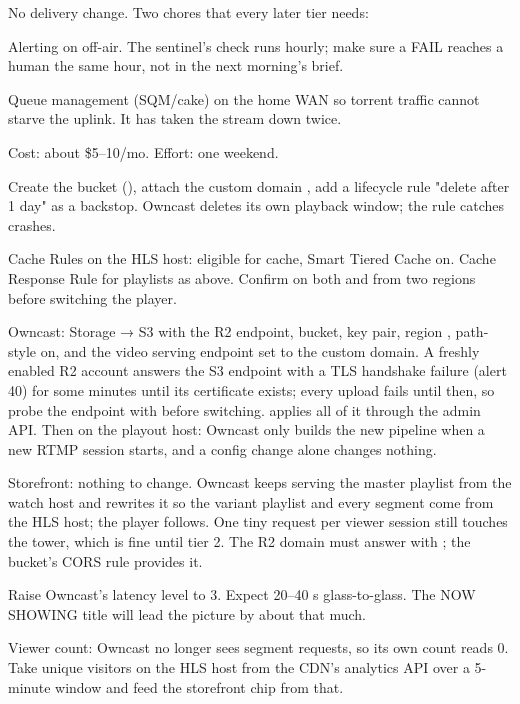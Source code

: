 \documentclass[fontpath=fonts/,logopath=logo/]{riposte-doc}
\begin{document}
No delivery change. Two chores that every later tier needs:

\begin{ripbullets}
\item Alerting on off-air. The sentinel's  check runs hourly; make sure a FAIL reaches a human the same hour, not in the next morning's brief.
\item Queue management (SQM/cake) on the home WAN so torrent traffic cannot starve the uplink. It has taken the stream down twice.
\end{ripbullets}


Cost: about \$5–10/mo. Effort: one weekend.

\begin{ripbullets}
\item Create the bucket (), attach the custom domain , add a lifecycle rule "delete after 1 day" as a backstop. Owncast deletes its own playback window; the rule catches crashes.
\item Cache Rules on the HLS host: eligible for cache, Smart Tiered Cache on. Cache Response Rule for playlists as above. Confirm  on both  and  from two regions before switching the player.
\item Owncast: Storage → S3 with the R2 endpoint, bucket, key pair, region , path-style on, and the video serving endpoint set to the custom domain. A freshly enabled R2 account answers the S3 endpoint with a TLS handshake failure (alert 40) for some minutes until its certificate exists; every upload fails until then, so probe the endpoint with  before switching.  applies all of it through the admin API. Then  on the playout host: Owncast only builds the new pipeline when a new RTMP session starts, and a config change alone changes nothing.
\item Storefront: nothing to change. Owncast keeps serving the master playlist from the watch host and rewrites it so the variant playlist and every segment come from the HLS host; the player follows. One tiny request per viewer session still touches the tower, which is fine until tier 2. The R2 domain must answer with ; the bucket's CORS rule provides it.
\item Raise Owncast's latency level to 3. Expect 20–40 s glass-to-glass. The NOW SHOWING title will lead the picture by about that much.
\item Viewer count: Owncast no longer sees segment requests, so its own count reads 0. Take unique visitors on the HLS host from the CDN's analytics API over a 5-minute window and feed the storefront chip from that.
\end{ripbullets}
\end{document}
